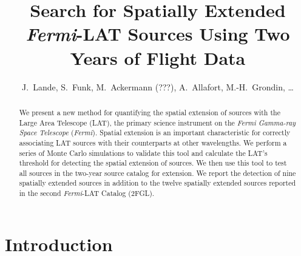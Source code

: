 \documentclass[12pt,preprint]{aastex}
\newcommand{\fermi}{\textit{Fermi}\xspace}
\begin{document}
\title{Search for Spatially Extended \fermi-LAT Sources Using Two Years of Flight
Data}


\author{
J.~Lande,
S.~Funk,
M.~Ackermann (???),
A.~Allafort,
M.-H.~Grondin,
\ldots
{}
}


\begin{abstract}
We present a new method for quantifying the spatial extension of sources
with the Large Area Telescope (LAT), the primary science instrument on
the {\em \fermi Gamma-ray Space Telescope} (\fermi).  Spatial extension
is an important characteristic for correctly associating LAT sources with
their counterparts at other wavelengths. We perform a series of Monte
Carlo simulations to validate this tool and calculate the LAT's threshold
for detecting the spatial extension of sources.  We then use this tool
to test all sources in the two-year source catalog for extension. We
report the detection of nine spatially extended sources in addition to
the twelve spatially extended sources reported in the second \fermi-LAT
Catalog (2FGL).
\end{abstract}

\section{Introduction}
\end{document}

